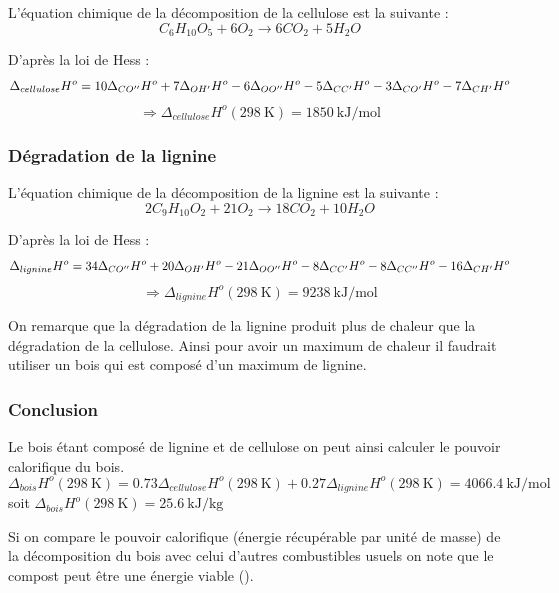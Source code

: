 \documentclass[../PS6_RapportFinal.tex]{subfiles}
\begin{document}
L'équation chimique de la décomposition de la cellulose est la suivante :
\[C_6H_{10}O_5 + 6O_2 \longrightarrow 6CO_2 + 5H_2O\]

D'après la loi de Hess :
\begin{multline*}
\Delta_{cellulose}H^o = 10 \Delta_{\tiny CO''} H^o  + 7 \Delta_{\tiny OH'} H^o - 6 \Delta_{\tiny OO''} H^o - 5 \Delta_{\tiny CC'} H^o  - 3 \Delta_{\tiny CO'} H^o  - 7 \Delta_{\tiny CH'} H^o
\end{multline*}
\[ \Rightarrow\Delta_{cellulose} H^o (298 \: \si{\kelvin}) = 1850 \: \si{\kilo\joule\per\mole}\]

\subsubsection{Dégradation de la lignine}
L'équation chimique de la décomposition de la lignine est la suivante :
\[2C_9H_{10}O_2 + 21O_2 \longrightarrow 18CO_2 + 10H_2O\]

D'après la loi de Hess :
\begin{multline*}
\Delta_{lignine} H^o  = 34 \Delta_{\tiny CO''} H^o + 20 \Delta_{\tiny OH'} H^o - 21 \Delta_{\tiny OO''} H^o - 8 \Delta_{\tiny CC'} H^o  - 8\Delta_{\tiny CC''} H^o  - 16\Delta_{\tiny CH'} H^o 
\end{multline*}
\[ \Rightarrow\Delta_{lignine} H^o (298 \: \si{\kelvin}) = 9238 \: \si{\kilo\joule\per\mole} \]

On remarque que la dégradation de la lignine produit plus de chaleur que la dégradation de la cellulose. Ainsi pour avoir un maximum de chaleur il faudrait utiliser un bois qui est composé d'un maximum de lignine.

\subsubsection{Conclusion}

Le bois étant composé de lignine et de cellulose on peut ainsi calculer le pouvoir calorifique du bois. 
\[\Delta_{bois} H^o (298 \: \si{\kelvin}) =\num{0.73} \Delta_{cellulose} H^o (298  \: \si{\kelvin})+ \num{0.27}\Delta_{lignine} H^o (298  \: \si{\kelvin}) = \num{4066.4} \: \si{\kilo\joule\per\mole}\]  
soit \(\Delta_{bois} H^o (298 \: \si{\kelvin}) = \num{25.6} \: \si{\kilo\joule\per\kilogram}\)

Si on compare le pouvoir calorifique (énergie récupérable par unité de masse) de la décomposition du bois avec celui d’autres combustibles usuels on note que le compost peut être une énergie viable ().
\end{document}
